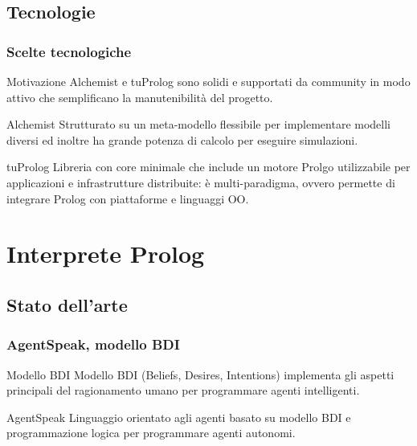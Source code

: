 \documentclass[handout]{beamer}\mode<presentation>{\usetheme{AMSCesenaBleu}}
\begin{document}
\subsection{Tecnologie}
\begin{frame}
\frametitle{Scelte tecnologiche}
\begin{block}{Motivazione}
Alchemist e tuProlog sono solidi e supportati da community in modo attivo che semplificano la manutenibilità del progetto. 
\end{block}

\begin{block}{Alchemist}
Strutturato su un meta-modello flessibile per implementare modelli diversi ed inoltre ha grande potenza di calcolo per eseguire simulazioni.
\end{block}

\begin{block}{tuProlog}
Libreria con core minimale che include un motore Prolgo utilizzabile per applicazioni e infrastrutture distribuite: è multi-paradigma, ovvero permette di integrare Prolog con piattaforme e linguaggi OO.
\end{block}
\end{frame}



\section{Interprete Prolog}

\subsection{Stato dell'arte}
\begin{frame}
\frametitle{AgentSpeak, modello BDI}
\begin{block}{Modello BDI}
Modello BDI (Beliefs, Desires, Intentions) implementa gli aspetti principali del ragionamento umano per programmare agenti intelligenti.
\end{block}
\begin{block}{AgentSpeak}
Linguaggio orientato agli agenti basato su modello BDI e programmazione logica per programmare agenti autonomi.
\end{block}
\end{frame}
\end{document}
